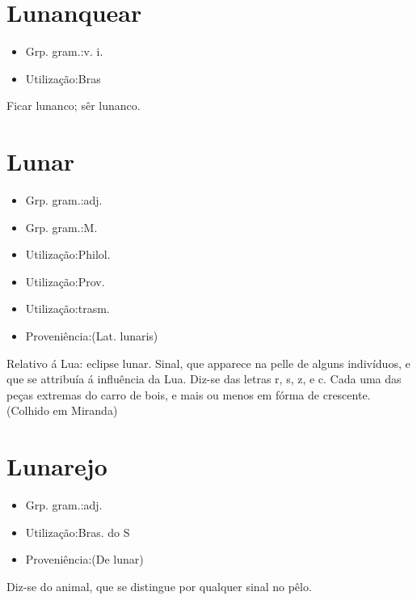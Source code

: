 \section{Lunanquear}
\begin{itemize}
\item {Grp. gram.:v. i.}
\end{itemize}
\begin{itemize}
\item {Utilização:Bras}
\end{itemize}
Ficar lunanco; sêr lunanco.
\section{Lunar}
\begin{itemize}
\item {Grp. gram.:adj.}
\end{itemize}
\begin{itemize}
\item {Grp. gram.:M.}
\end{itemize}
\begin{itemize}
\item {Utilização:Philol.}
\end{itemize}
\begin{itemize}
\item {Utilização:Prov.}
\end{itemize}
\begin{itemize}
\item {Utilização:trasm.}
\end{itemize}
\begin{itemize}
\item {Proveniência:(Lat. \textunderscore lunaris\textunderscore )}
\end{itemize}
Relativo á Lua: \textunderscore eclipse lunar\textunderscore .
Sinal, que apparece na pelle de alguns indivíduos, e que se attribuía á influência da Lua.
Diz-se das letras \textunderscore r\textunderscore , \textunderscore s\textunderscore , \textunderscore z\textunderscore , e \textunderscore c\textunderscore .
Cada uma das peças extremas do carro de bois, e mais ou menos em fórma de crescente. (Colhido em Miranda)
\section{Lunarejo}
\begin{itemize}
\item {Grp. gram.:adj.}
\end{itemize}
\begin{itemize}
\item {Utilização:Bras. do S}
\end{itemize}
\begin{itemize}
\item {Proveniência:(De \textunderscore lunar\textunderscore )}
\end{itemize}
Diz-se do animal, que se distingue por qualquer sinal no pêlo.
